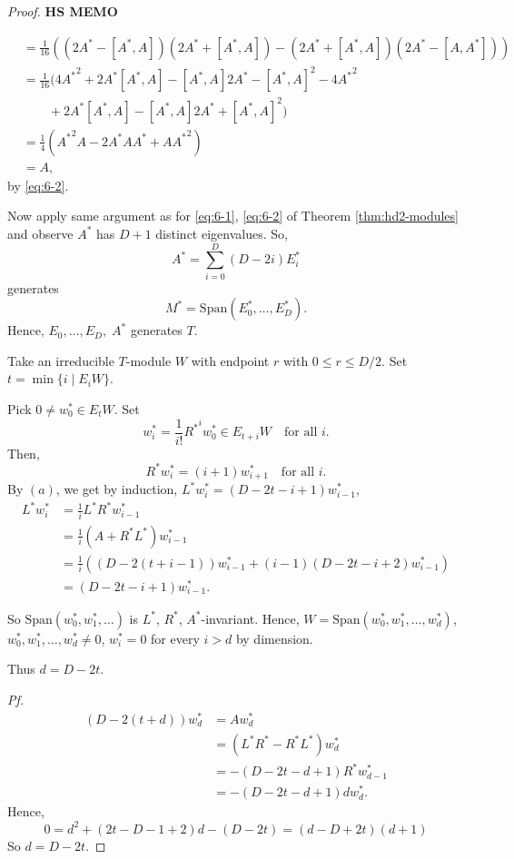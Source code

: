 \documentclass[
]{book}
\theoremstyle{definition}
\theoremstyle{definition}
\theoremstyle{definition}
\theoremstyle{definition}
\theoremstyle{remark}
\begin{document}
\begin{proof}
\textbf{HS MEMO}

\begin{align}
[L^*,R^*] & = \frac{1}{16}((2A^*-[A^*,A])(2A^*+[A^*,A]) - (2A^*+[A^*,A])(2A^*- [A,A^*]))\\
& = \frac{1}{16}(4{A^*}^2 + 2A^*[A^*,A] - [A^*,A]2A^* - [A^*,A]^2 - 4{A^*}^2\\
& \qquad + 2A^*[A^*,A] - [A^*,A]2A^* + [A^*,A]^2)\\
& = \frac{1}{4}({A^*}^2A - 2A^*AA^* + A{A^*}^2)\\
& = A,
\end{align}
by \eqref{eq:6-2}.

Now apply same argument as for \eqref{eq:6-1}, \eqref{eq:6-2} of Theorem \ref{thm:hd2-modules} and observe \(A^*\) has \(D+1\) distinct eigenvalues. So,
\[A^* = \sum_{i=0}^D(D-2i)E^*_i\]
generates
\[M^* = \mathrm{Span}(E^*_0, \ldots, E^*_D).\]
Hence, \(E_0, \ldots, E_D, \; A^*\) generates \(T\).

Take an irreducible \(T\)-module \(W\) with endpoint \(r\) with \(0\leq r \leq D/2\). Set
\(t = \min\{i\mid E_iW\}\).

Pick \(0\neq w_0^*\in E_tW\). Set
\[w_i^* = \frac{1}{i!}{R^*}^i w_0^* \in E_{t+i}W \quad \text{for all }i.\]
Then,
\[R^*w_i^* = (i+1)w_{i+1}^* \quad \text{for all }i.\]
By \((a)\), we get by induction, \(L^*w_i^* = (D-2t-i+1)w^*_{i-1}\),
\begin{align}
L^*w_i^* & = \frac{1}{i}L^*R^*w_{i-1}^* \\
& = \frac{1}{i}(A + R^*L^*)w_{i-1}^* \\
& = \frac{1}{i}((D-2(t+i-1))w^*_{i-1} + (i-1)(D-2t-i+2)w_{i-1}^*)\\
& = (D-2t - i + 1)w_{i-1}^*.
\end{align}

So \(\mathrm{Span}(w_0^*, w_1^*, \ldots )\) is \(L^*\), \(R^*\), \(A^*\)-invariant. Hence,
\(W = \mathrm{Span}(w_0^*, w_1^*, \ldots, w_d^*)\), \(w_0^*, w_1^*, \ldots, w_d^* \neq 0\), \(w^*_i = 0\) for every \(i>d\) by dimension.

Thus \(d = D-2t\).

\emph{Pf.}
\begin{align}
(D -2(t+d))w^*_d & = Aw_d^* \\
& = (L^*R^* - R^*L^*)w_d^*\\
& = -(D-2t - d + 1)R^*w_{d-1}^*\\
& = -(D-2t - d +1)dw^*_d.
\end{align}
Hence,
\[0 = d^2 + (2t - D - 1 + 2)d - (D-2t) = (d-D+2t)(d+1)\]
So \(d = D-2t\).
\end{proof}
\end{document}
